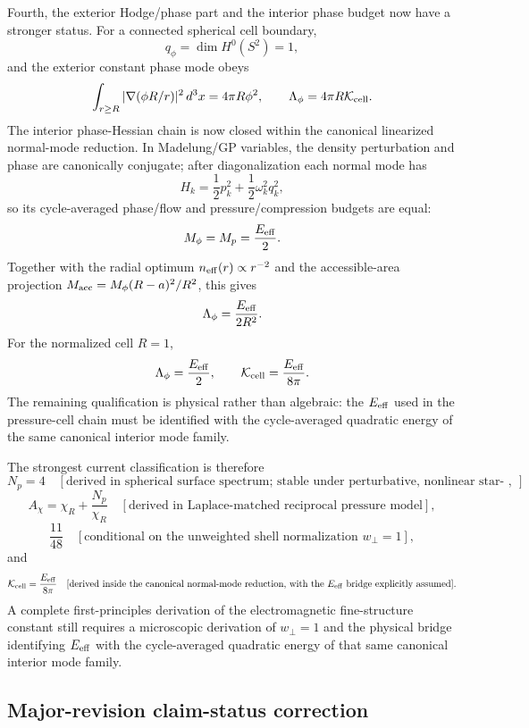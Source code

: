 \documentclass[aps,pra,preprint,longbibliography,nofootinbib]{revtex4-2}
\begin{document}
Fourth, the exterior Hodge/phase part and the interior phase budget now have a
stronger status.  For a connected spherical cell boundary,
\[
  q_\phi=\dim H^0(S^2)=1,
\]
and the exterior constant phase mode obeys
\[
  \int_{r\ge R}|\nabla(\phi R/r)|^2\,d^3x=4\pi R\phi^2,
  \qquad
  \Lambda_\phi=4\pi R\mathcal K_{\rm cell}.
\]
The interior phase-Hessian chain is now closed within the canonical linearized
normal-mode reduction.  In Madelung/GP variables, the density perturbation and
phase are canonically conjugate; after diagonalization each normal mode has
\[
  H_k=\frac12p_k^2+\frac12\omega_k^2q_k^2,
\]
so its cycle-averaged phase/flow and pressure/compression budgets are equal:
\[
  M_\phi=M_p=\frac{E_{\rm eff}}{2}.
\]
Together with the radial optimum \(n_{\rm eff}(r)\propto r^{-2}\) and the
accessible-area projection \(M_{\rm acc}=M_\phi(R-a)^2/R^2\), this gives
\[
  \Lambda_\phi=\frac{E_{\rm eff}}{2R^2}.
\]
For the normalized cell \(R=1\),
\[
  \Lambda_\phi=\frac{E_{\rm eff}}{2},
  \qquad
  \mathcal K_{\rm cell}=\frac{E_{\rm eff}}{8\pi}.
\]
The remaining qualification is physical rather than algebraic: the
\(E_{\rm eff}\) used in the pressure-cell chain must be identified with the
cycle-averaged quadratic energy of the same canonical interior mode family.

The strongest current classification is therefore
\[
  N_p=4
  \quad[\text{derived in spherical surface spectrum; stable under perturbative, nonlinear star-shaped, and finite-perimeter global-topology checks}],
\]
\[
  A_\chi=\chi_R+\frac{N_p}{\chi_R}
  \quad[\text{derived in Laplace-matched reciprocal pressure model}],
\]
\[
  \frac{11}{48}
  \quad[\text{conditional on the unweighted shell normalization }w_\perp=1],
\]
and
\[
  \mathcal K_{\rm cell}=\frac{E_{\rm eff}}{8\pi}
  \quad[\text{derived inside the canonical normal-mode reduction, with the }E_{\rm eff}\text{ bridge explicitly assumed}].
\]
A complete first-principles derivation of the electromagnetic fine-structure
constant still requires a microscopic derivation of \(w_\perp=1\) and the
physical bridge identifying \(E_{\rm eff}\) with the cycle-averaged quadratic
energy of that same canonical interior mode family.




\subsection*{Major-revision claim-status correction}
\end{document}
